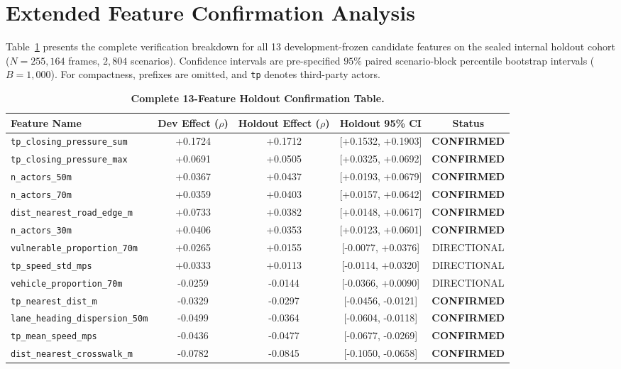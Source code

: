 \section{Extended Feature Confirmation Analysis}
\label{sec:supp_features}

Table~\ref{tab:supp_features} presents the complete verification breakdown for all 13 development-frozen candidate features on the sealed internal holdout cohort ($N=255,164$ frames, $2,804$ scenarios). Confidence intervals are pre-specified $95\%$ paired scenario-block percentile bootstrap intervals ($B=1,000$). For compactness, prefixes are omitted, and \texttt{tp} denotes third-party actors.

\begin{table}[h]
\centering
\footnotesize
\setlength{\tabcolsep}{4pt}
\renewcommand{\arraystretch}{0.88}
\vspace{-3mm}
\caption{\textbf{Complete 13-Feature Holdout Confirmation Table.}}
\label{tab:supp_features}
\begin{tabular}{lcccc}
\toprule
\textbf{Feature Name} & \textbf{Dev Effect ($\rho$)} & \textbf{Holdout Effect ($\rho$)} & \textbf{Holdout 95\% CI} & \textbf{Status} \\
\midrule
\texttt{tp\_closing\_pressure\_sum} & +0.1724 & +0.1712 & [+0.1532, +0.1903] & \textbf{CONFIRMED} \\
\texttt{tp\_closing\_pressure\_max} & +0.0691 & +0.0505 & [+0.0325, +0.0692] & \textbf{CONFIRMED} \\
\texttt{n\_actors\_50m} & +0.0367 & +0.0437 & [+0.0193, +0.0679] & \textbf{CONFIRMED} \\
\texttt{n\_actors\_70m} & +0.0359 & +0.0403 & [+0.0157, +0.0642] & \textbf{CONFIRMED} \\
\texttt{dist\_nearest\_road\_edge\_m} & +0.0733 & +0.0382 & [+0.0148, +0.0617] & \textbf{CONFIRMED} \\
\texttt{n\_actors\_30m} & +0.0406 & +0.0353 & [+0.0123, +0.0601] & \textbf{CONFIRMED} \\
\texttt{vulnerable\_proportion\_70m} & +0.0265 & +0.0155 & [-0.0077, +0.0376] & DIRECTIONAL \\
\texttt{tp\_speed\_std\_mps} & +0.0333 & +0.0113 & [-0.0114, +0.0320] & DIRECTIONAL \\
\texttt{vehicle\_proportion\_70m} & -0.0259 & -0.0144 & [-0.0366, +0.0090] & DIRECTIONAL \\
\texttt{tp\_nearest\_dist\_m} & -0.0329 & -0.0297 & [-0.0456, -0.0121] & \textbf{CONFIRMED} \\
\texttt{lane\_heading\_dispersion\_50m} & -0.0499 & -0.0364 & [-0.0604, -0.0118] & \textbf{CONFIRMED} \\
\texttt{tp\_mean\_speed\_mps} & -0.0436 & -0.0477 & [-0.0677, -0.0269] & \textbf{CONFIRMED} \\
\texttt{dist\_nearest\_crosswalk\_m} & -0.0782 & -0.0845 & [-0.1050, -0.0658] & \textbf{CONFIRMED} \\
\bottomrule
\end{tabular}
\end{table}
